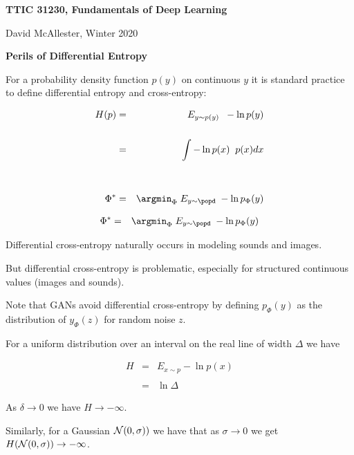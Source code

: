 




{\Huge

  \centerline{\bf TTIC 31230, Fundamentals of Deep Learning}
  \bigskip
  \centerline{David McAllester, Winter 2020}
  \vfill
  \centerline{\bf Perils of Differential Entropy}
  \vfill
\vfill
\vfill


For a probability density function $p(y)$ on continuous $y$ it is standard practice to define differential entropy and cross-entropy:

\vfill
\begin{eqnarray*}
H(p) & = & E_{y \sim p(y)}\;\;-\ln p(y) \\
\\
& = & \int - \ln p(x)\;\; p(x) dx \\
\\
\\
\Phi^* & = & \argmin_\Phi \;E_{y \sim \popd}\;-\ln p_\Phi(y)
\end{eqnarray*}


\begin{eqnarray*}
\Phi^* & = & \argmin_\Phi \;E_{y \sim \popd}\;-\ln p_\Phi(y)
\end{eqnarray*}

\vfill
Differential cross-entropy naturally occurs in modeling sounds and images.

\vfill
But differential cross-entropy is problematic, especially for structured continuous values (images and sounds).

\vfill
Note that GANs avoid differential cross-entropy by defining $p_\Phi(y)$ as the distribution of $y_\Phi(z)$ for random noise $z$.


For a uniform distribution over an interval on the real line of width $\Delta$ we have

\begin{eqnarray*}
H & = & E_{x \sim p} -\ln p(x) \\
\\
& = & \ln \Delta
\end{eqnarray*}

As $\delta \rightarrow 0$ we have $H \rightarrow -\infty$.

Similarly, for a Gaussian ${\cal N}(0,\sigma))$ we have that as $\sigma \rightarrow 0$ we get$H({\cal N}(0,\sigma)) \rightarrow -\infty$.

}
